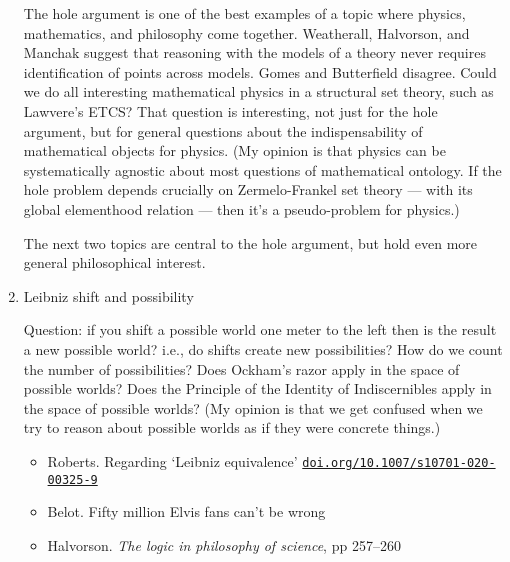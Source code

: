 \documentclass[11pt]{article}
\newcommand\rurl[1]{%
  \href{http://#1}{\nolinkurl{#1}}%
}
\begin{document}
\begin{enumerate}
  The hole argument is one of the best examples of a topic where
  physics, mathematics, and philosophy come together. Weatherall,
  Halvorson, and Manchak suggest that reasoning with the models of a
  theory never requires identification of points across models. Gomes
  and Butterfield disagree. Could we do all interesting mathematical
  physics in a structural set theory, such as Lawvere's ETCS? That
  question is interesting, not just for the hole argument, but for
  general questions about the indispensability of mathematical objects
  for physics. (My opinion is that physics can be systematically
  agnostic about most questions of mathematical ontology. If the hole
  problem depends crucially on Zermelo-Frankel set theory --- with its
  global elementhood relation --- then it's a pseudo-problem for
  physics.)

  The next two topics are central to the hole argument, but hold even
  more general philosophical interest.

\item Leibniz shift and possibility

  Question: if you shift a possible world one meter to the left then
  is the result a new possible world? i.e., do shifts create new
  possibilities? How do we count the number of possibilities? Does
  Ockham's razor apply in the space of possible worlds? Does the
  Principle of the Identity of Indiscernibles apply in the space of
  possible worlds? (My opinion is that we get confused when we try to
  reason about possible worlds as if they were concrete things.)

  \begin{itemize}
  \item Roberts. Regarding `Leibniz equivalence'
    \rurl{doi.org/10.1007/s10701-020-00325-9}
  \item Belot. Fifty million Elvis fans can't be wrong
  \item Halvorson. \emph{The logic in philosophy of science}, pp
    257--260
  \end{itemize}


\end{enumerate}
\end{document}
